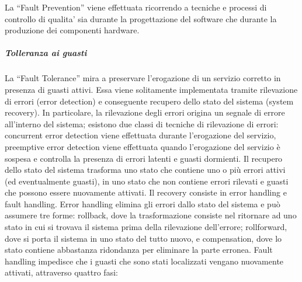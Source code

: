 \documentclass[14pt]{extarticle}
\begin{document}
La “Fault Prevention” viene effettuata ricorrendo a tecniche e processi di controllo di qualita’ sia durante la progettazione del software che durante la produzione dei componenti hardware.
\subparagraph{Tolleranza ai guasti}
La “Fault Tolerance” mira a preservare l'erogazione di un servizio corretto in
presenza di guasti attivi. Essa viene solitamente implementata tramite rilevazione di errori (error detection) e conseguente recupero dello stato del sistema
(system recovery). In particolare, la rilevazione degli errori origina un segnale
di errore all'interno del sistema; esistono due classi di tecniche di rilevazione
di errori: concurrent error detection viene effettuata durante l'erogazione del
servizio, preemptive error detection viene effettuata quando l'erogazione del
servizio è sospesa e controlla la presenza di errori latenti e guasti dormienti.
Il recupero dello stato del sistema trasforma uno stato che contiene uno o più
errori attivi (ed eventualmente guasti), in uno stato che non contiene errori
rilevati e guasti che possono essere nuovamente attivati. Il recovery consiste
in error handling e fault handling. Error handling elimina gli errori dallo
stato del sistema e può assumere tre forme: rollback, dove la trasformazione consiste nel ritornare ad uno stato in cui si trovava il sistema prima della
rilevazione dell'errore; rollforward, dove si porta il sistema in uno stato del
tutto nuovo, e compensation, dove lo stato contiene abbastanza ridondanza
per eliminare la parte erronea. Fault handling impedisce che i guasti che sono
stati localizzati vengano nuovamente attivati, attraverso quattro fasi:
\end{document}
